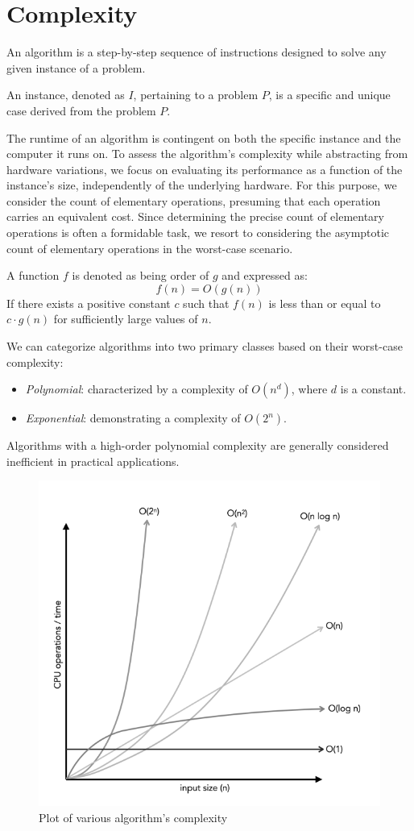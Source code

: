 \section{Complexity}

\begin{definition}
    An algorithm is a step-by-step sequence of instructions designed to solve any given instance of a problem.
\end{definition}
\begin{definition}
    An instance, denoted as $I$, pertaining to a problem $P$, is a specific and unique case derived from the problem $P$.
\end{definition}

The runtime of an algorithm is contingent on both the specific instance and the computer it runs on. 
To assess the algorithm's complexity while abstracting from hardware variations, we focus on evaluating its performance as a function of the instance's size, independently of the underlying hardware. 
For this purpose, we consider the count of elementary operations, presuming that each operation carries an equivalent cost. 
Since determining the precise count of elementary operations is often a formidable task, we resort to considering the asymptotic count of elementary operations in the worst-case scenario.
\begin{definition}
    A function $f$ is denoted as being order of $g$ and expressed as:
    \[f(n)=O(g(n))\]
    If there exists a positive constant $c$ such that $f(n)$ is less than or equal to $c \cdot g(n)$ for sufficiently large values of $n$.
\end{definition}
We can categorize algorithms into two primary classes based on their worst-case complexity:
\begin{itemize}
    \item \textit{Polynomial}: characterized by a complexity of $O(n^d)$, where $d$ is a constant.
    \item \textit{Exponential}: demonstrating a complexity of $O(2^n)$. 
\end{itemize}
Algorithms with a high-order polynomial complexity are generally considered inefficient in practical applications.
\begin{figure}[H]
    \centering
    \includegraphics[width=0.5\linewidth]{images/complexity.png}
    \caption{Plot of various algorithm's complexity}
\end{figure}
